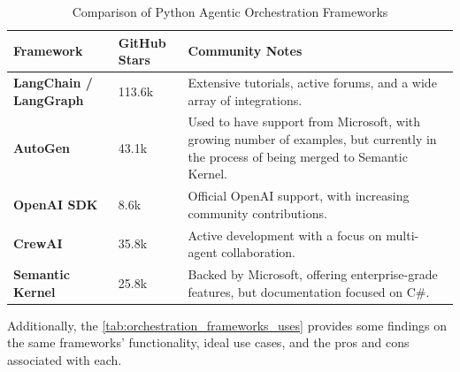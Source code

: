 \documentclass[a4paper]{report}
\begin{document}
\begin{table}[h]
\centering
\begin{tabular}{|p{3cm}|p{3cm}|p{9cm}|}
\hline
\textbf{Framework} & \textbf{GitHub Stars} & \textbf{Community Notes} \\ \hline
\textbf{LangChain / LangGraph} & 113.6k & Extensive tutorials, active forums, and a wide array of integrations. \\ \hline
\textbf{AutoGen} & 43.1k & Used to have support from Microsoft, with growing number of examples, but currently in the process of being merged to Semantic Kernel. \\ \hline
\textbf{OpenAI SDK} & 8.6k & Official OpenAI support, with increasing community contributions. \\ \hline
\textbf{CrewAI} & 35.8k & Active development with a focus on multi-agent collaboration. \\ \hline
\textbf{Semantic Kernel} & 25.8k & Backed by Microsoft, offering enterprise-grade features, but documentation focused on C\#. \\ \hline
\end{tabular}
\caption{Comparison of Python Agentic Orchestration Frameworks}
\label{tab:orchestration_frameworks_stars}
\end{table}

Additionally, the \autoref{tab:orchestration_frameworks_uses} provides some findings on the same frameworks' functionality, ideal use cases, and the pros and cons associated with each.
\end{document}

